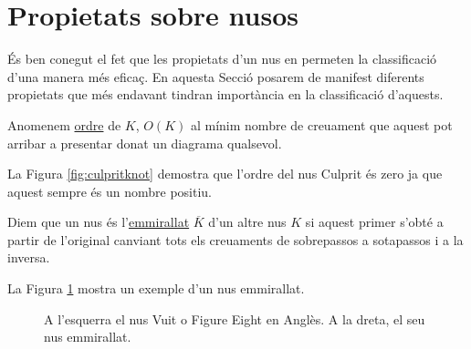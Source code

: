 
\section{Propietats sobre nusos}\label{sec:Propietats_sobre_nusos}

És ben conegut el fet que les propietats d'un nus en permeten la classificació d'una manera més eficaç. En aquesta Secció posarem de manifest diferents propietats que més endavant tindran importància en la classificació d'aquests.

\begin{definition}\label{def:ordre}
	Anomenem \underline{ordre} de $K$, $O(K)$ al mínim nombre de creuament que aquest pot arribar a presentar donat un diagrama qualsevol.
\end{definition}

La Figura \ref{fig:culpritknot} demostra que l'ordre del nus Culprit és zero ja que aquest sempre és un nombre positiu.

\begin{definition}\label{def:nusemmirallat}
	Diem que un nus és l'\underline{emmirallat} $\overline{K}$ d'un altre nus $K$ si aquest primer s'obté a partir de l'original canviant tots els creuaments de sobrepassos a sotapassos i a la inversa.
\end{definition}

La Figura \ref{fig:nus emmirallat} mostra un exemple d'un nus emmirallat.\\

\begin{figure}
	\caption{A l'esquerra el nus Vuit o Figure Eight en Anglès. A la dreta, el seu nus emmirallat.}\label{fig:nus emmirallat}
\end{figure}

